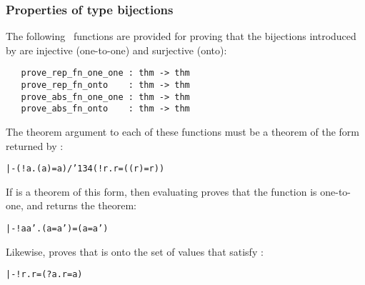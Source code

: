 \subsubsection{Properties of type bijections}

The following \ML\ functions are provided for proving that the bijections
introduced by  are injective (one-to-one)
and surjective (onto):

\begin{boxed}
\begin{verbatim}
   prove_rep_fn_one_one : thm -> thm
   prove_rep_fn_onto    : thm -> thm
   prove_abs_fn_one_one : thm -> thm
   prove_abs_fn_onto    : thm -> thm
\end{verbatim}\end{boxed}

\noindent The theorem argument to each of these functions must be a theorem
of the form returned by :

{\def\bk{\char'134}
\begin{hol}\begin{alltt}
   |- (!a. ( a) = a) /\bk (!r.  r = (( r) = r))
\end{alltt}\end{hol}}

\noindent If  is a theorem of this form, then evaluating
 proves that the function  is
one-to-one, and returns the theorem:

\begin{hol}\begin{alltt}
   |- !a a'. ( a =  a') = (a = a')
\end{alltt}\end{hol}

\noindent Likewise,  proves that  is
onto the set of values that satisfy :

{\def\bk{\char'134}
\begin{hol}\begin{alltt}
   |- !r.  r = (?a. r =  a)
\end{alltt}\end{hol}}

